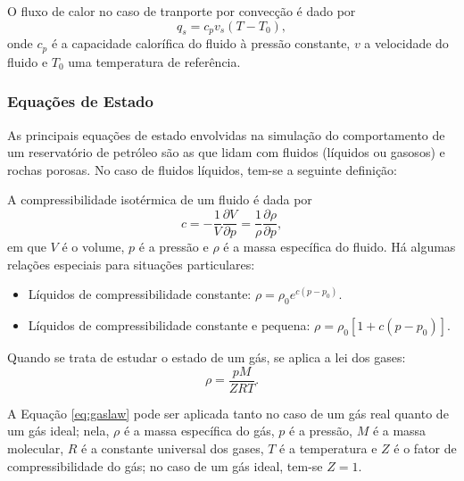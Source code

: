 \begin{theorem}[Convec\c{c}\~{a}o]
O fluxo de calor no caso de tranporte por convec\c{c}\~{a}o \'{e} dado por
\begin{equation}
	q_s = c_p v_s (T - T_0),
\end{equation}
onde $c_p$ \'{e} a capacidade calor\'{i}fica do fluido \`{a} press\~{a}o constante, $v$ a velocidade do fluido e $T_0$ uma temperatura de refer\^{e}ncia.
\end{theorem}

\subsubsection{Equa\c{c}\~{o}es de Estado}
As principais equa\c{c}\~{o}es de estado envolvidas na simula\c{c}\~{a}o do comportamento de um reservat\'{o}rio de petr\'{o}leo s\~{a}o as que lidam com fluidos (l\'{i}quidos ou gasosos) e rochas porosas. No caso de fluidos l\'{i}quidos, tem-se a seguinte defini\c{c}\~{a}o:

\begin{definition}
A compressibilidade isot\'{e}rmica de um fluido \'{e} dada por
\begin{equation}
	c = -\frac{1}{V}\frac{\partial V}{\partial p} = \frac{1}{\rho}\frac{\partial \rho}{\partial p},
\end{equation}
em que $V$ \'{e} o volume, $p$ \'{e} a press\~{a}o e $\rho$ \'{e} a massa espec\'{i}fica do fluido. H\'{a} algumas rela\c{c}\~{o}es especiais para situa\c{c}\~{o}es particulares:
\begin{itemize}
\item L\'{i}quidos de compressibilidade constante: $\rho = \rho_0 e^{c(p-p_0)}$.
\item L\'{i}quidos de compressibilidade constante e pequena: $\rho = \rho_0 \left[1+c\left(p-p_0\right)\right]$.
\end{itemize}
\end{definition}

Quando se trata de estudar o estado de um g\'{a}s, se aplica a lei dos gases:
\begin{equation}\label{eq:gaslaw}
	\rho = \frac{pM}{ZRT}.
\end{equation}

A Equa\c{c}\~{a}o \eqref{eq:gaslaw} pode ser aplicada tanto no caso de um g\'{a}s real quanto de um g\'{a}s ideal; nela, $\rho$ \'{e} a massa espec\'{i}fica do g\'{a}s, $p$ \'{e} a press\~{a}o, $M$ \'{e} a massa molecular, $R$ \'{e} a constante universal dos gases, $T$ \'{e} a temperatura e $Z$ \'{e} o fator de compressibilidade do g\'{a}s; no caso de um g\'{a}s ideal, tem-se $Z = 1$.


